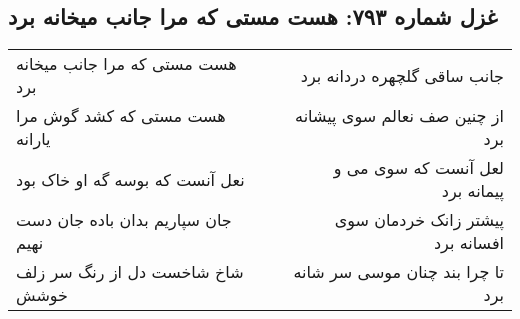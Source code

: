 \begin{center}
\section*{غزل شماره ۷۹۳: هست مستی که مرا جانب میخانه برد}
\label{sec:0793}
\begin{longtable}{l p{0.5cm} r}
هست مستی که مرا جانب میخانه برد
&&
جانب ساقی گلچهره دردانه برد
\\
هست مستی که کشد گوش مرا یارانه
&&
از چنین صف نعالم سوی پیشانه برد
\\
نعل آنست که بوسه گه او خاک بود
&&
لعل آنست که سوی می و پیمانه برد
\\
جان سپاریم بدان باده جان دست نهیم
&&
پیشتر زانک خردمان سوی افسانه برد
\\
شاخ شاخست دل از رنگ سر زلف خوشش
&&
تا چرا بند چنان موسی سر شانه برد
\\
\end{longtable}
\end{center}
